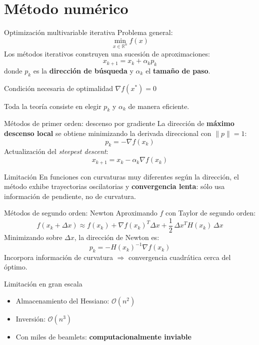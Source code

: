 \documentclass[11pt]{beamer}
\begin{document}
\section{Método numérico}

\begin{frame}{Optimización multivariable iterativa}
Problema general:
\[
    \min_{x \in \mathbb{R}^n} f(x)
\]
Los métodos iterativos construyen una sucesión de aproximaciones:
\[
    x_{k+1} = x_k + \alpha_k p_k
\]
donde $p_k$ es la \textbf{dirección de búsqueda} y $\alpha_k$ el \textbf{tamaño de paso}.
\begin{block}{Condición necesaria de optimalidad}
    $\nabla f(x^*) = 0$
\end{block}
Toda la teoría consiste en elegir $p_k$ y $\alpha_k$ de manera eficiente.
\end{frame}

\begin{frame}{Métodos de primer orden: descenso por gradiente}
La dirección de \textbf{máximo descenso local} se obtiene minimizando la derivada direccional con $\|p\| = 1$:
\[
    p_k = -\nabla f(x_k)
\]
Actualización del \textit{steepest descent}:
\[
    x_{k+1} = x_k - \alpha_k \nabla f(x_k)
\]
\begin{alertblock}{Limitación}
    En funciones con curvaturas muy diferentes según la dirección, el método exhibe trayectorias oscilatorias y \textbf{convergencia lenta}: sólo usa información de pendiente, no de curvatura.
\end{alertblock}
\end{frame}

\begin{frame}{Métodos de segundo orden: Newton}
Aproximando $f$ con Taylor de segundo orden:
\[
    f(x_k + \Delta x) \approx f(x_k) + \nabla f(x_k)^T \Delta x + \frac{1}{2}\,\Delta x^T H(x_k)\,\Delta x
\]
Minimizando sobre $\Delta x$, la dirección de Newton es:
\[
    p_k = -H(x_k)^{-1} \nabla f(x_k)
\]
Incorpora información de curvatura $\Rightarrow$ convergencia cuadrática cerca del óptimo.
\begin{alertblock}{Limitación en gran escala}
    \begin{itemize}
        \item Almacenamiento del Hessiano: $\mathcal{O}(n^2)$
        \item Inversión: $\mathcal{O}(n^3)$
        \item Con miles de beamlets: \textbf{computacionalmente inviable}
    \end{itemize}
\end{alertblock}
\end{frame}
\end{document}
